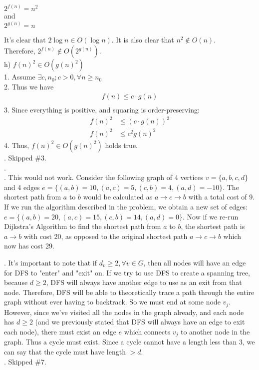 \documentclass[12pt]{report}
\newcommand{\no}{\noindent}
\newcommand{\tab}{\hspace*{.6cm}}
\begin{document}
	\centering
	$2^{f(n)} = n^2$\\
	and\\
	$2^{g(n)} = n$\\
	\justify
	
	\tab It's clear that $2\log{n} \in O(\log{n})$. It is also clear that $n^2 \notin O(n)$.\\
	Therefore, $2^{f(n)} \notin O(2^{g(n)})$.\\
	
	\no h) 	$f(n)^2 \in O(g(n)^2)$\\
	\tab 1. Assume $\exists c, n_0; c > 0, \forall n \geq n_0$\\
	\tab 2. Thus we have 
	\begin{align*}
	f(n) \leq c \cdot g(n) \\
	\end{align*}
	\tab 3. Since everything is positive, and squaring is order-preserving:
	\begin{align*}
	f(n)^2 &\leq (c\cdot g(n))^2\\
	f(n)^2 &\leq c^2g(n)^2
	\end{align*}
	\tab 4. Thus, $f(n)^2 \in O(g(n)^2)$ holds true.\\

	\no 3. Skipped \#3.\\

	\no 4. \\

	\no 5. This would not work. Consider the following graph of 4 vertices $v=\{a, b, c, d\}$ and 4 edges $e = \{(a,b) = 10, (a, c) = 5, (c, b) = 4, (a,d) = -10\}$. The shortest path from $a$ to $b$ would be calculated as $a\rightarrow c \rightarrow b$ with a total cost of 9. If we run the algorithm described in the problem, we obtain a new set of edges: $e = \{(a,b) = 20, (a,c) = 15, (c,b) = 14, (a,d) = 0\}$. Now if we re-run Dijkstra's Algorithm to find the shortest path from $a$ to $b$, the shortest path is $a\rightarrow b$ with cost 20, as opposed to the original shortest path $a\rightarrow c \rightarrow b$ which now has cost 29. \\
	
	\pagebreak
	
	\no 6. It's important to note that if $d_v \geq 2, \forall v \in G$, then all nodes will have an edge for DFS to "enter" and "exit" on. If we try to use DFS to create a spanning tree, because $d \geq 2$, DFS will always have another edge to use as an exit from that node. Therefore, DFS will be able to theoretically trace a path through the entire graph without ever having to backtrack. So we must end at some node $v_j$. However, since we've visited all the nodes in the graph already, and each node has $d \geq 2$ (and we previously stated that DFS will always have an edge to exit each node), there must exist an edge $e$ which connects $v_j$ to another node in the graph. Thus a cycle must exist. Since a cycle cannot have a length less than 3, we can say that the cycle must have length $> d$.\\

	\no 7. Skipped \#7.\\
\end{document}
